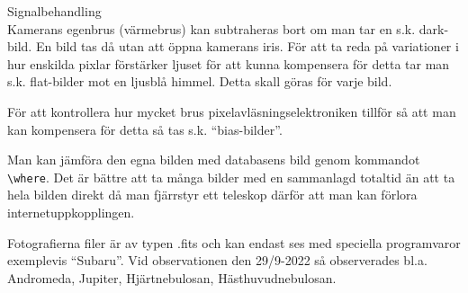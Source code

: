 \documentclass[./exercises.tex]{subfiles}
\begin{document}
\begin{enumerate}
Signalbehandling\\
Kamerans egenbrus (värmebrus) kan subtraheras bort om man tar en s.k. dark-bild. En bild tas då utan att öppna kamerans iris.
För att ta reda på variationer i hur enskilda pixlar förstärker ljuset för att kunna kompensera för detta tar man s.k.
flat-bilder mot en ljusblå himmel. Detta skall göras för varje bild.

För att kontrollera hur mycket brus pixelavläsningselektroniken tillför så att man kan kompensera för detta
så tas s.k. ``bias-bilder''.

Man kan jämföra den egna bilden med databasens bild genom kommandot \verb+\where+.
Det är bättre att ta många bilder med en sammanlagd totaltid än att ta hela bilden direkt då man 
fjärrstyr ett teleskop därför att man kan förlora internetuppkopplingen.

Fotografierna filer är av typen .fits och kan endast ses med speciella programvaror exemplevis
``Subaru''.
Vid observationen den 29/9-2022 så observerades bl.a. Andromeda, Jupiter, Hjärtnebulosan, Hästhuvudnebulosan.





\end{enumerate}








\end{document}
